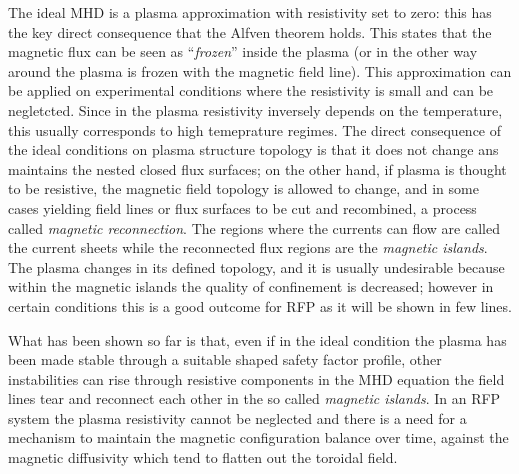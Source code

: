The ideal MHD is a plasma approximation with resistivity set to zero: this has the key direct consequence that the Alfven theorem holds. This states that the magnetic flux can be seen as ``\textit{frozen}'' inside the plasma (or in the other way around the plasma is frozen with the magnetic field line).
This approximation can be applied on experimental conditions where the resistivity is small and can be negletcted. Since in the plasma resistivity inversely depends on the temperature, this usually corresponds to high temeprature regimes.
The direct consequence of the ideal conditions on plasma structure topology is that it does not change ans maintains the nested closed flux surfaces; on the other hand, if plasma is thought to be resistive, the magnetic field topology is allowed to change, and in some cases yielding field lines or flux surfaces to be cut and recombined, a process called \textit{magnetic reconnection}. The regions where the currents can flow are called the current sheets while the reconnected flux regions are the \textit{magnetic islands}. The plasma changes in its defined topology, and it is usually undesirable because within the magnetic islands the quality of confinement is decreased; however in certain conditions this is a good outcome for RFP as it will be shown in few lines.

What has been shown so far is that, even if in the ideal condition the plasma has been made stable through a suitable shaped safety factor profile, other instabilities can rise through resistive components in the MHD equation the field lines tear and reconnect each other in the so called \textit{magnetic islands}.
In an RFP system the plasma resistivity cannot be neglected and there is a need for a mechanism to maintain the magnetic configuration balance over time, against the magnetic diffusivity which tend to flatten out the toroidal field.

